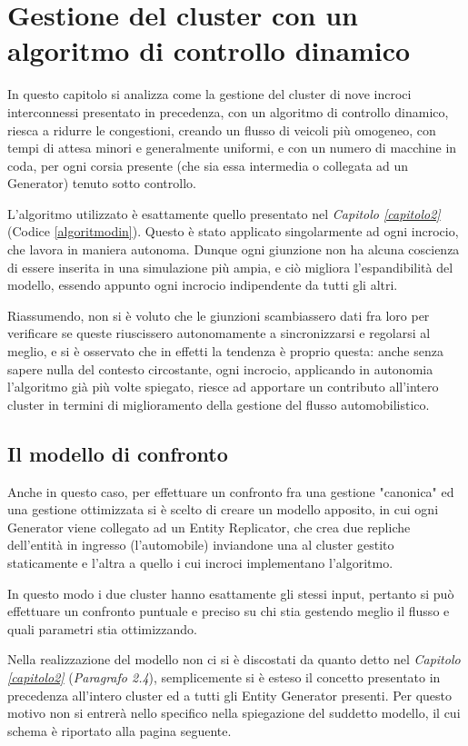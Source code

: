 \chapter{Gestione del cluster con un algoritmo di controllo dinamico}
In questo capitolo si analizza come la gestione del cluster di nove incroci interconnessi presentato in precedenza, con un algoritmo di controllo dinamico, riesca a ridurre le congestioni, creando un flusso di veicoli più omogeneo, con tempi di attesa minori e generalmente uniformi, e con un numero di macchine in coda, per ogni corsia presente (che sia essa intermedia o collegata ad un Generator) tenuto sotto controllo.

L'algoritmo utilizzato è esattamente quello presentato nel \textit{Capitolo \ref{capitolo2}} (Codice \ref{algoritmodin}). Questo è stato applicato singolarmente ad ogni incrocio, che lavora in maniera autonoma. Dunque ogni giunzione non ha alcuna coscienza di essere inserita in una simulazione più ampia, e ciò migliora l'espandibilità del modello, essendo appunto ogni incrocio indipendente da tutti gli altri.

Riassumendo, non si è voluto che le giunzioni scambiassero dati fra loro per verificare se queste riuscissero autonomamente a sincronizzarsi e regolarsi al meglio, e si è osservato che in effetti la tendenza è proprio questa: anche senza sapere nulla del contesto circostante, ogni incrocio, applicando in autonomia l'algoritmo già più volte spiegato, riesce ad apportare un contributo all'intero cluster in termini di miglioramento della gestione del flusso automobilistico.
\newpage

\section{Il modello di confronto}
Anche in questo caso, per effettuare un confronto fra una gestione "canonica" ed una gestione ottimizzata si è scelto di creare un modello apposito, in cui ogni Generator viene collegato ad un Entity Replicator, che crea due repliche dell'entità in ingresso (l'automobile) inviandone una al cluster gestito staticamente e l'altra a quello i cui incroci implementano l'algoritmo. 

In questo modo i due cluster hanno esattamente gli stessi input, pertanto si può effettuare un confronto puntuale e preciso su chi stia gestendo meglio il flusso e quali parametri stia ottimizzando.
\newline

Nella realizzazione del modello non ci si è discostati da quanto detto nel \textit{Capitolo \ref{capitolo2}} (\textit{Paragrafo 2.4}), semplicemente si è esteso il concetto presentato in precedenza all'intero cluster ed a tutti gli Entity Generator presenti. Per questo motivo non si entrerà nello specifico nella spiegazione del suddetto modello, il cui schema è riportato alla pagina seguente.
\newpage

